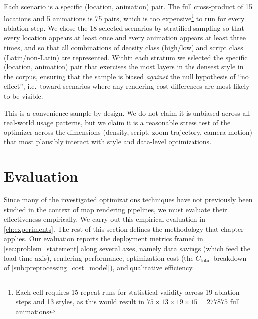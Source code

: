 Each scenario is a specific (location, animation) pair.
The full cross-product of 15 locations and 5 animations is 75 pairs, which is too expensive\footnote{Each cell requires 15 repeat runs for statistical validity across 19 ablation steps and 13 styles, as this would result in $75 \times 13 \times 19 \times 15 = \num{277875}$ full animations} to run for every ablation step.
We chose the 18 selected scenarios by stratified sampling so that every location appears at least once and every animation appears at least three times, and so that all combinations of density class (high/low) and script class (Latin/non-Latin) are represented.
Within each stratum we selected the specific (location, animation) pair that exercises the most layers in the densest style in the corpus, ensuring that the sample is biased \emph{against} the null hypothesis of \enquote{no effect}, i.e.\ toward scenarios where any rendering-cost differences are most likely to be visible.

This is a convenience sample by design.
We do not claim it is unbiased across all real-world usage patterns, but we claim it is a reasonable stress test of the optimizer across the dimensions (density, script, zoom trajectory, camera motion) that most plausibly interact with style and data-level optimizations.

\section{Evaluation}\label{sec:evaluation}

Since many of the investigated optimizations techniques have not previously been studied in the context of map rendering pipelines, we must evaluate their effectiveness empirically.
We carry out this empirical evaluation in \cref{ch:experiments}.
The rest of this section defines the methodology that chapter applies.
Our evaluation reports the deployment metrics framed in \cref{sec:problem_statement} along several axes, namely data savings (which feed the load-time axis), rendering performance, optimization cost (the $C_\text{total}$ breakdown of \cref{sub:preprocessing_cost_model}), and qualitative efficiency.

